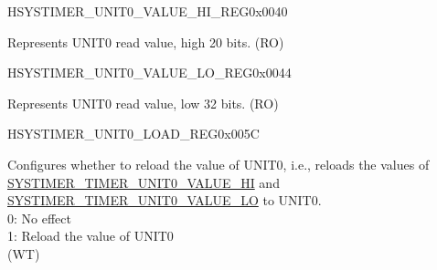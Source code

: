 \begin{register}{H}{SYSTIMER\_UNIT0\_VALUE\_HI\_REG}{0x0040}\label{regdesc:SYSTIMERUNIT0VALUEHIREG}
%
%
\regnewline%
\begin{regdesc}\begin{reglist}
\label{fielddesc:SYSTIMERTIMERUNIT0VALUEHI}\item [SYSTIMER\_TIMER\_UNIT0\_VALUE\_HI] Represents UNIT0 read value, high 20 bits. (RO)
\end{reglist}\end{regdesc}
\end{register}


\begin{register}{H}{SYSTIMER\_UNIT0\_VALUE\_LO\_REG}{0x0044}\label{regdesc:SYSTIMERUNIT0VALUELOREG}
%
\regnewline%
\begin{regdesc}\begin{reglist}
\label{fielddesc:SYSTIMERTIMERUNIT0VALUELO}\item [SYSTIMER\_TIMER\_UNIT0\_VALUE\_LO] Represents UNIT0 read value, low 32 bits. (RO)
\end{reglist}\end{regdesc}
\end{register}


\begin{register}{H}{SYSTIMER\_UNIT0\_LOAD\_REG}{0x005C}\label{regdesc:SYSTIMERUNIT0LOADREG}
%
%
\regnewline%
\begin{regdesc}\begin{reglist}
\label{fielddesc:SYSTIMERTIMERUNIT0LOAD}\item [SYSTIMER\_TIMER\_UNIT0\_LOAD] Configures whether to reload the value of UNIT0, i.e., reloads the values of \hyperref[fielddesc:SYSTIMERTIMERUNIT0VALUEHI]{SYSTIMER\_TIMER\_UNIT0\_VALUE\_HI} and \hyperref[fielddesc:SYSTIMERTIMERUNIT0VALUELO]{SYSTIMER\_TIMER\_UNIT0\_VALUE\_LO} to UNIT0. \\
0: No effect \\
1: Reload the value of UNIT0\\
(WT)
\end{reglist}\end{regdesc}
\end{register}


